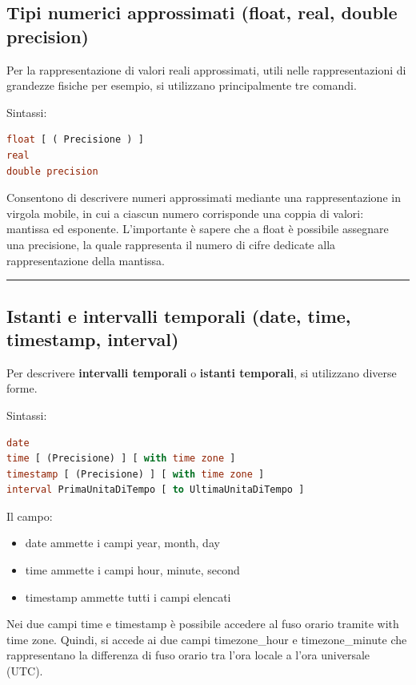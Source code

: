 \documentclass[a4paper]{article}
\newcommand{\longline}{\noindent\rule{\textwidth}{0.4pt}}
\begin{document}
	\subsection{Tipi numerici approssimati (\textsf{float}, \textsf{real}, \textsf{double precision})}
	
	Per la rappresentazione di valori reali approssimati, utili nelle rappresentazioni di grandezze fisiche per esempio, si utilizzano principalmente tre comandi.\newline

	\noindent
	Sintassi:
	\begin{lstlisting}[language=SQL]
float [ ( Precisione ) ]
real
double precision \end{lstlisting}
	Consentono di descrivere numeri approssimati mediante una rappresentazione in virgola mobile, in cui a ciascun numero corrisponde una coppia di valori: mantissa ed esponente. L'importante è sapere che a \textsf{float} è possibile assegnare una precisione, la quale rappresenta il numero di cifre dedicate alla rappresentazione della mantissa.
	
	\longline
	
	\subsection{Istanti e intervalli temporali (\textsf{date}, \textsf{time}, \textsf{timestamp}, \textsf{interval})}
	
	Per descrivere \textbf{intervalli temporali} o \textbf{istanti temporali}, si utilizzano diverse forme.\newline
	
	\noindent
	Sintassi:
	\begin{lstlisting}[language=SQL]
date
time [ (Precisione) ] [ with time zone ]
timestamp [ (Precisione) ] [ with time zone ]
interval PrimaUnitaDiTempo [ to UltimaUnitaDiTempo ]\end{lstlisting}
	Il campo:
	\begin{itemize}
		\item \textsf{date} ammette i campi \textsf{year, month, day}
		\item \textsf{time} ammette i campi \textsf{hour, minute, second}
		\item \textsf{timestamp} ammette tutti i campi elencati
	\end{itemize}
	Nei due campi \textsf{time} e \textsf{timestamp} è possibile accedere al fuso orario tramite \textsf{with time zone}. Quindi, si accede ai due campi \textsf{timezone\_hour} e \textsf{timezone\_minute} che rappresentano la differenza di fuso orario tra l'ora locale a l'ora universale (UTC).\newpage
	
\end{document}
